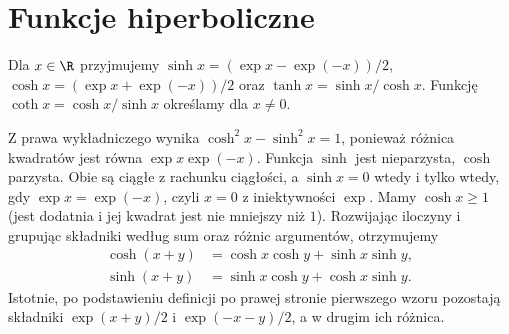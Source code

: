 \section{Funkcje hiperboliczne}
\begin{definicja}
\label{ma1:def:hyperbolic}
Dla $x\in\R$ przyjmujemy
$\sinh x=(\exp x-\exp(-x))/2$,
$\cosh x=(\exp x+\exp(-x))/2$ oraz $\tanh x=\sinh x/\cosh x$. Funkcję $\coth x=\cosh x/\sinh x$ określamy dla $x\ne0$.
\end{definicja}
Z prawa wykładniczego wynika $\cosh^2x-\sinh^2x=1$, ponieważ różnica kwadratów jest równa $\exp x\exp(-x)$. Funkcja $\sinh$ jest nieparzysta, $\cosh$ parzysta. Obie są ciągłe z rachunku ciągłości, a $\sinh x=0$ wtedy i tylko wtedy, gdy $\exp x=\exp(-x)$, czyli $x=0$ z iniektywności $\exp$. Mamy $\cosh x\ge1$ (jest dodatnia i jej kwadrat jest nie mniejszy niż $1$). Rozwijając iloczyny i grupując składniki według sum oraz różnic argumentów, otrzymujemy
\begin{align*}
 \cosh(x+y)&=\cosh x\cosh y+\sinh x\sinh y,\\
 \sinh(x+y)&=\sinh x\cosh y+\cosh x\sinh y.
\end{align*}
Istotnie, po podstawieniu definicji po prawej stronie pierwszego wzoru pozostają składniki $\exp(x+y)/2$ i $\exp(-x-y)/2$, a w drugim ich różnica.

